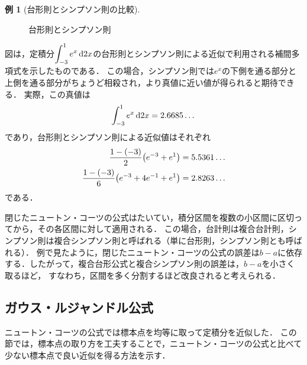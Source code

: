 \documentclass[a4paper]{ltjsarticle}
\theoremstyle{definition}
\newtheorem{example}{例}[section]
\DeclarePairedDelimiter{\pqty}{\lparen}{\rparen}
\newcommand{\dd}[1]{\dl2#1}
\begin{document}
\begin{example}[台形則とシンプソン則の比較]
  \label{example:simpson_vs_trapezoid}
  \begin{figure}[H]
    \centering
    \caption{台形則とシンプソン則}
  \end{figure}
  
  図は，定積分$\displaystyle \int_{-3}^1 e^x \dd{x}$の台形則とシンプソン則による近似で利用される補間多項式を示したものである．
  この場合，シンプソン則では$e^x$の下側を通る部分と上側を通る部分がちょうど相殺され，より真値に近い値が得られると期待できる．
  実際，この真値は
  \[
    \int_{-3}^1 e^x \dd{x} = 2.6685\dots
  \]
  であり，台形則とシンプソン則による近似値はそれぞれ
  \begin{align*}
    \frac{1-(-3)}{2} \pqty*{e^{-3}+e^1} &= 5.5361\dots \\
    \frac{1-(-3)}{6} \pqty*{e^{-3} + 4e^{-1} + e^1} &= 2.8263\dots
  \end{align*}
  である．  
\end{example}

閉じたニュートン・コーツの公式はたいてい，積分区間を複数の小区間に区切ってから，その各区間に対して適用される．
この場合，台計則は複合台計則，シンプソン則は複合シンプソン則と呼ばれる（単に台形則，シンプソン則とも呼ばれる）．
例で見たように，閉じたニュートン・コーツの公式の誤差は$b-a$に依存する．したがって，複合台形公式と複合シンプソン則の誤差は，$b-a$を小さく取るほど，
すなわち，区間を多く分割するほど改良されると考えられる．

\subsection{ガウス・ルジャンドル公式}
ニュートン・コーツの公式では標本点を均等に取って定積分を近似した．
この節では，標本点の取り方を工夫することで，ニュートン・コーツの公式と比べて少ない標本点で良い近似を得る方法を示す．
\end{document}
